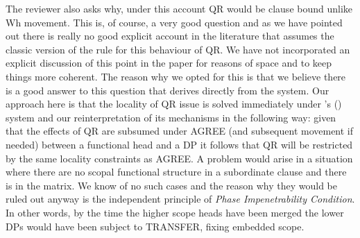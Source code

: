 \documentclass[11pt]{article}
\newcommand{\citeposs}[1]{\citeauthor{#1}'s (\citeyear{#1})}
\begin{document}
The reviewer also asks why, under this account QR would be clause bound unlike Wh movement. This is, of course, a very good question and as we have pointed out there is really no good explicit account in the literature that assumes the classic version of the rule for this behaviour of QR.  We have not incorporated an explicit discussion of this point in the paper for reasons of space and to keep things more coherent.  The reason why we opted for this is that we believe there is a good answer to this question that derives directly from the system. Our approach here is that the locality of QR issue is solved immediately under \citeposs{Beghelli-Stowell97} system and our reinterpretation of its mechanisms in the following way: given that the effects of QR are subsumed under AGREE (and subsequent movement if needed) between a functional head and a DP it follows that QR will be restricted by the same locality constraints as AGREE.  A problem would arise in a situation where there are no scopal functional structure in a subordinate clause and there is in the matrix.  We know of no such cases and the reason why they would be ruled out anyway is the independent principle of \textit{Phase Impenetrability Condition}.  In other words, by the time the higher scope heads have been merged the lower DPs would have been subject to TRANSFER, fixing embedded scope.


\end{document}
